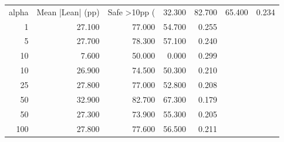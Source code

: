 \begin{tabular}{rrrrr}
\toprule
alpha & Mean |Lean| (pp) & Safe >10pp (%
 & 32.300 & 82.700 & 65.400 & 0.234 \\
1 & 27.100 & 77.000 & 54.700 & 0.255 \\
5 & 27.700 & 78.300 & 57.100 & 0.240 \\
10 & 7.600 & 50.000 & 0.000 & 0.299 \\
10 & 26.900 & 74.500 & 50.300 & 0.210 \\
25 & 27.800 & 77.000 & 52.800 & 0.208 \\
50 & 32.900 & 82.700 & 67.300 & 0.179 \\
50 & 27.300 & 73.900 & 55.300 & 0.205 \\
100 & 27.800 & 77.600 & 56.500 & 0.211 \\
\bottomrule
\end{tabular}
